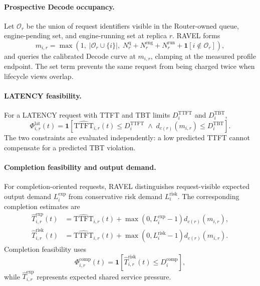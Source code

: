 \paragraph{Prospective Decode occupancy.}
Let $\mathcal{O}_r$ be the union of request identifiers visible in the
Router-owned queue, engine-pending set, and engine-running set at replica $r$.
RAVEL forms
\begin{equation}
    m_{i,r}
    =
    \max\!\left(
        1,\;
        \left|\mathcal{O}_r\cup\{i\}\right|,\;
        N_r^{\mathrm{q}}+N_r^{\mathrm{eng}}+N_r^{\mathrm{run}}
        +\mathbf{1}[i\notin\mathcal{O}_r]
    \right),
    \label{eq:appendix:prospective-seqs}
\end{equation}
and queries the calibrated Decode curve at $m_{i,r}$, clamping at the measured
profile endpoint.
The set term prevents the same request from being charged twice when lifecycle
views overlap.

\paragraph{LATENCY feasibility.}
For a LATENCY request with TTFT and TBT limits
$D_i^{\mathrm{TTFT}}$ and $D_i^{\mathrm{TBT}}$,
\begin{equation}
    \Phi^{\mathrm{lat}}_{i,r}(t)
    =
    \mathbf{1}\!\left[
        \widehat{\mathrm{TTFT}}_{i,r}(t)
        \le D_i^{\mathrm{TTFT}}
        \;\land\;
        d_{c(r)}(m_{i,r})
        \le D_i^{\mathrm{TBT}}
    \right].
    \label{eq:appendix:latency-feasible}
\end{equation}
The two constraints are evaluated independently: a low predicted TTFT cannot
compensate for a predicted TBT violation.

\paragraph{Completion feasibility and output demand.}
For completion-oriented requests, RAVEL distinguishes request-visible expected
output demand $L_i^{\mathrm{exp}}$ from conservative risk demand
$L_i^{\mathrm{risk}}$.
The corresponding completion estimates are
\begin{align}
    \widehat{T}^{\mathrm{exp}}_{i,r}(t)
    &=
    \widehat{\mathrm{TTFT}}_{i,r}(t)
    +
    \max(0,L_i^{\mathrm{exp}}-1)d_{c(r)}(m_{i,r}),
    \label{eq:appendix:completion-exp}\\
    \widehat{T}^{\mathrm{risk}}_{i,r}(t)
    &=
    \widehat{\mathrm{TTFT}}_{i,r}(t)
    +
    \max(0,L_i^{\mathrm{risk}}-1)d_{c(r)}(m_{i,r}).
    \label{eq:appendix:completion-risk}
\end{align}
Completion feasibility uses
\begin{equation}
    \Phi^{\mathrm{comp}}_{i,r}(t)
    =
    \mathbf{1}\!\left[
        \widehat{T}^{\mathrm{risk}}_{i,r}(t)
        \le D_i^{\mathrm{comp}}
    \right],
    \label{eq:appendix:completion-feasible}
\end{equation}
while $\widehat{T}^{\mathrm{exp}}_{i,r}$ represents expected shared service
pressure.

